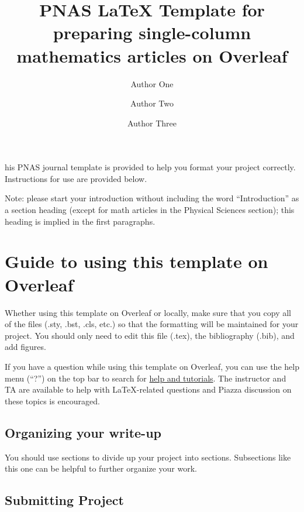 \documentclass[9pt,twoside]{pnas-new}
\title{PNAS LaTeX Template for preparing single-column mathematics articles on Overleaf}
\author[a]{Author One}
\author[a]{Author Two}
\author[a]{Author Three}
\affil[a]{University of California, Los Angeles}
\begin{document}
\maketitle
\thispagestyle{firststyle}

his PNAS journal template is provided to help you format your project correctly. Instructions for use are provided below. 

Note: please start your introduction without including the word ``Introduction'' as a section heading (except for math articles in the Physical Sciences section); this heading is implied in the first paragraphs. 

\section*{Guide to using this template on Overleaf}

Whether using this template on Overleaf or locally, make sure that you copy all of the files (.sty, .bst, .cls, etc.) so that the formatting will be maintained for your project. You should only need to edit this file (.tex), the bibliography (.bib), and add figures.

If you have a question while using this template on Overleaf, you can use the help menu (``?'') on the top bar to search for \href{https://www.overleaf.com/help}{help and tutorials}. The instructor and TA are available to help with LaTeX-related questions and Piazza discussion on these topics is encouraged.

\subsection*{Organizing your write-up}

You should use sections to divide up your project into sections. Subsections like this one can be helpful to further organize your work. 

\subsection*{Submitting Project}
\end{document}
